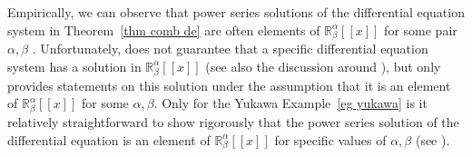 \documentclass[oneside]{amsart}
\theoremstyle{definition}
\newcommand{\R}{{\mathbb{R}}}
\begin{document}
Empirically, we can observe that power series solutions of the differential equation system in Theorem~\ref{thm comb de} are often elements of $\R^\alpha_\beta[[x]]$ for some pair $\alpha,\beta$ \cite{BD,BDM,BB}. Unfortunately, \cite[Proposition~38]{Bgenfun} does not guarantee that a specific differential equation system has a solution in $\R^\alpha_\beta[[x]]$ (see also the discussion around \cite[Proposition 55]{Bgenfun}), but only provides statements on this solution under the assumption that it is an element of $\R^\alpha_\beta[[x]]$ for some $\alpha,\beta$. Only for the Yukawa Example~\ref{eg yukawa} is it relatively straightforward to show rigorously that the power series solution of the differential equation is an element of $\R^\alpha_\beta[[x]]$ for specific values of $\alpha, \beta$ (see \cite[Section 7.1]{Bgenfun}). 
%
%
\end{document}

